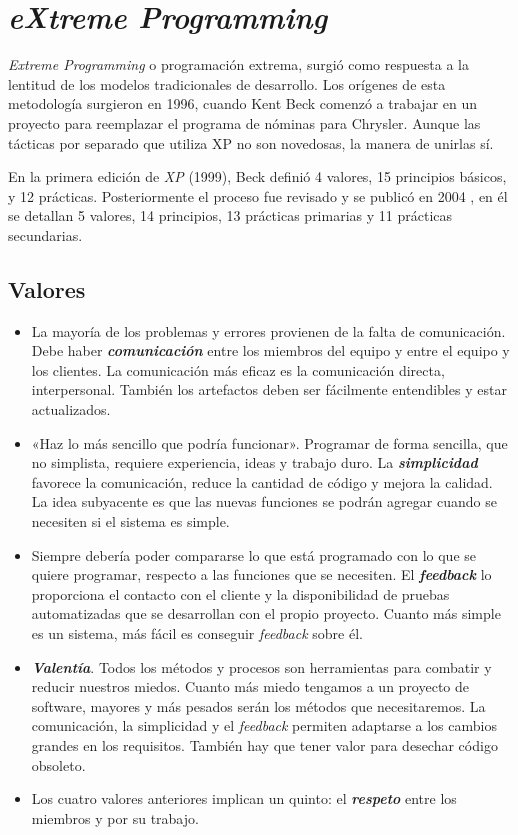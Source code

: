 \section{\textit{eXtreme Programming}}
\textit{Extreme Programming}  o programación extrema, surgió como respuesta a la lentitud de los modelos tradicionales de desarrollo. Los orígenes de esta metodología surgieron en 1996, cuando Kent Beck comenzó a trabajar en un proyecto para reemplazar el programa de nóminas para Chrysler. Aunque las tácticas por separado que utiliza XP no son novedosas, la manera de unirlas sí. 

En la primera edición de \textit{XP} (1999), Beck definió 4 valores, 15 principios básicos, y 12 prácticas. Posteriormente el proceso fue revisado y se publicó en 2004 \cite{Beck:2004:EPE:1076267}, en él se detallan 5 valores, 14 principios, 13 prácticas primarias y 11 prácticas secundarias.

\subsection{Valores}
\begin{itemize}
\item La mayoría de los problemas y errores provienen de la falta de comunicación. Debe haber \textbf{\textit{comunicación}} entre los miembros del equipo y entre el equipo y los clientes. La comunicación más eficaz es la comunicación directa, interpersonal. También los artefactos deben ser fácilmente entendibles y estar actualizados.

\item «Haz lo más sencillo que podría funcionar». Programar de forma sencilla, que no simplista, requiere experiencia, ideas y trabajo duro. La \textbf{\textit{simplicidad}} favorece la comunicación, reduce la cantidad de código y mejora la calidad. La idea subyacente es que las nuevas funciones se podrán agregar cuando se necesiten si el sistema es simple.

\item Siempre debería poder compararse lo que está programado con lo que se quiere programar, respecto a las funciones que se necesiten. El \textbf{\textit{feedback}} lo proporciona el contacto con el cliente y la disponibilidad de pruebas automatizadas que se desarrollan con el propio proyecto. Cuanto más simple es un sistema, más fácil es conseguir \textit{feedback} sobre él. 

\item \textbf{\textit{Valentía}}. Todos los métodos y procesos son herramientas para combatir y reducir nuestros miedos. Cuanto más miedo tengamos a un proyecto de software, mayores y más pesados serán los métodos que necesitaremos. La comunicación, la simplicidad y el \textit{feedback} permiten adaptarse a los cambios grandes en los requisitos. También hay que tener valor para desechar código obsoleto.

\item Los cuatro valores anteriores implican un quinto: el \textbf{\textit{respeto}} entre los miembros y por su trabajo.
\end{itemize}

